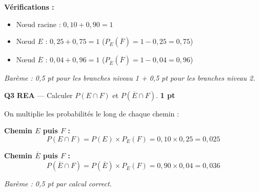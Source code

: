 \documentclass[a4paper,11pt]{article}
\newcommand{\pts}[1]{\hfill\textcolor{gris}{\small\textbf{#1}}}
\newcommand{\comp}[1]{\colorbox{blue!10}{\scriptsize\textbf{#1}}}
\begin{document}
\begin{corrbox}
\begin{center}
\end{center}

\textbf{Vérifications :}
\begin{itemize}[nosep]
  \item Nœud racine : $0{,}10 + 0{,}90 = 1$ \checkmark
  \item Nœud $E$ : $0{,}25 + 0{,}75 = 1$ \checkmark \quad ($P_E(\overline{F}) = 1 - 0{,}25 = 0{,}75$)
  \item Nœud $\overline{E}$ : $0{,}04 + 0{,}96 = 1$ \checkmark \quad ($P_{\overline{E}}(\overline{F}) = 1 - 0{,}04 = 0{,}96$)
\end{itemize}

\textit{Barème : 0,5 pt pour les branches niveau 1 + 0,5 pt pour les branches niveau 2.}
\end{corrbox}

\textbf{Q3} \comp{REA} — Calculer $P(E \cap F)$ et $P(\overline{E} \cap F)$. \pts{1 pt}

\begin{corrbox}
On multiplie les probabilités le long de chaque chemin :

\textbf{Chemin $E$ puis $F$ :}
\[
P(E \cap F) = P(E) \times P_E(F) = 0{,}10 \times 0{,}25 = \boxed{0{,}025}
\]

\textbf{Chemin $\overline{E}$ puis $F$ :}
\[
P(\overline{E} \cap F) = P(\overline{E}) \times P_{\overline{E}}(F) = 0{,}90 \times 0{,}04 = \boxed{0{,}036}
\]

\textit{Barème : 0,5 pt par calcul correct.}
\end{corrbox}
\end{document}
